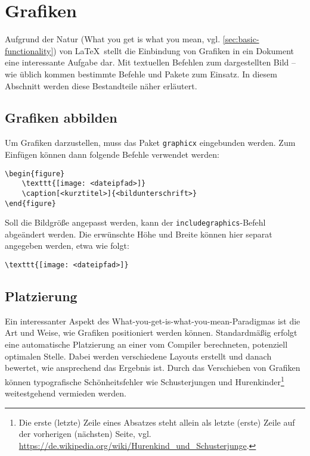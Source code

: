\section{Grafiken}
\label{sec:graphics}

Aufgrund der Natur (What you get is what you mean, vgl. \cref{sec:basic-functionality}) von \LaTeX \  stellt die Einbindung von Grafiken in ein Dokument eine interessante Aufgabe dar. Mit textuellen Befehlen zum dargestellten Bild -- wie üblich kommen bestimmte Befehle und Pakete zum Einsatz. In diesem Abschnitt werden diese Bestandteile näher erläutert.

\subsection{Grafiken abbilden}
\label{sub:display-graphics}
Um Grafiken darzustellen, muss das Paket \texttt{graphicx} eingebunden werden. Zum Einfügen können dann folgende Befehle verwendet werden:  

\begin{verbatim}
\begin{figure}
	\texttt{[image: <dateipfad>]}
	\caption[<kurztitel>]{<bildunterschrift>}
\end{figure}
\end{verbatim}

\noindent Soll die Bildgröße angepasst werden, kann der \texttt{includegraphics}-Befehl abgeändert werden. 
Die erwünschte Höhe und Breite können hier separat angegeben werden, etwa wie folgt: 

\begin{verbatim}
\texttt{[image: <dateipfad>]}
\end{verbatim}

\subsection{Platzierung}
\label{sub:graphics-placement}
Ein interessanter Aspekt des What-you-get-is-what-you-mean-Paradigmas ist die Art und Weise, wie Grafiken positioniert werden können. 
Standardmäßig erfolgt eine automatische Platzierung an einer vom Compiler berechneten, potenziell optimalen Stelle.
Dabei werden verschiedene Layouts erstellt und danach bewertet, wie ansprechend das Ergebnis ist.
Durch das Verschieben von Grafiken können typografische Schönheitsfehler wie Schusterjungen und Hurenkinder\footnote{Die erste (letzte) Zeile eines Absatzes steht allein als letzte (erste) Zeile auf der vorherigen (nächsten) Seite, vgl. \url{https://de.wikipedia.org/wiki/Hurenkind_und_Schusterjunge}.} weitestgehend vermieden werden. 

